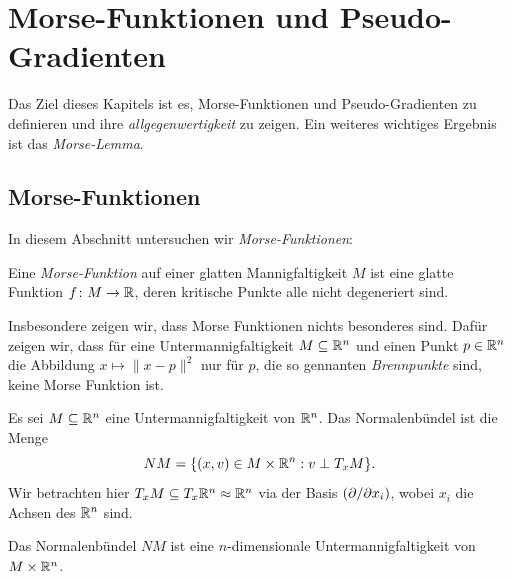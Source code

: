 \chapter{Morse-Funktionen und Pseudo-Gradienten}

Das Ziel dieses Kapitels ist es, Morse-Funktionen und Pseudo-Gradienten zu
definieren und ihre 
\textit{allgegenwertigkeit} zu zeigen. Ein weiteres wichtiges Ergebnis ist
das \textit{Morse-Lemma}.

\section{Morse-Funktionen}

In diesem Abschnitt untersuchen wir \textit{Morse-Funktionen}:

\begin{definition}
    \label{def: morse-funktion}
    Eine \textit{Morse-Funktion} auf einer glatten Mannigfaltigkeit $M$ ist eine glatte Funktion
    $f \colon M \to { \mathbb R }$, deren kritische Punkte alle nicht degeneriert sind.
\end{definition}

Insbesondere zeigen wir, dass Morse Funktionen nichts besonderes sind. Dafür zeigen wir, dass für 
eine Untermannigfaltigkeit $M \subseteq { \mathbb R }^n$ und einen Punkt $p \in { \mathbb R }^n$ die Abbildung
$x \mapsto \| x - p \|^2$ nur für $p$, die so gennanten \textit{Brennpunkte}
sind, keine Morse Funktion ist.

\begin{definition}[Normalenbündel]
    \label{def: normalenbuendel}
    Es sei $M \subseteq { \mathbb R }^n$ eine Untermannigfaltigkeit von ${ \mathbb R }^n$. Das Normalenbündel ist die 
    Menge
    \[ NM = \{ (x, v) \in M \times { \mathbb R }^n : v \perp T_xM \} . \]
    Wir betrachten hier $T_xM \subseteq T_x{ \mathbb R }^n \approx { \mathbb R }^n$ via der Basis 
    $\left( { \partial } / { \partial } x_i \right)$, wobei $x_i$ die Achsen des ${ \mathbb R }^n$ sind.
\end{definition}

\begin{prop}
    \label{prop: NM ist untermannigfaltigkeit}
    Das Normalenbündel $NM$ ist eine $n$-dimensionale Untermannigfaltigkeit von $M \times { \mathbb R }^n$.
\end{prop}

